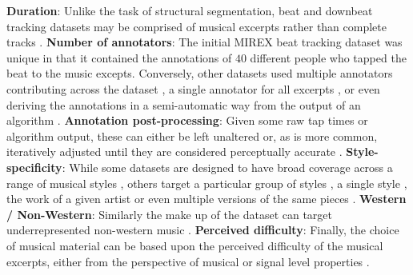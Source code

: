 \textbf{Duration}: Unlike the task of structural segmentation, beat and downbeat tracking datasets may be comprised of musical excerpts \cite{hainsworth04jasp,mckinney07jnmr,hockman12ismir, krebs13ismir} rather than complete tracks \cite{goto06ismir,Mauch2009a,digiorgi2016jaes,eremenko18ismir}. \textbf{Number of annotators}: The initial MIREX beat tracking dataset \cite{mckinney07jnmr} was unique in that it contained the annotations of $40$ different people who tapped the beat to the music excepts. Conversely, other datasets used multiple annotators contributing across the dataset \cite{holzapfel12taslp}, a single annotator for all excerpts \cite{hainsworth04jasp}, or even deriving the annotations in a semi-automatic way from the output of an algorithm \cite{Mauch2009a}. \textbf{Annotation post-processing}: Given some raw tap times or algorithm output, these can either be left unaltered \cite{mckinney07jnmr} or, as is more common, iteratively adjusted until they are considered perceptually accurate \cite{holzapfel12taslp, hainsworth04jasp, hockman12ismir}. \textbf{Style-specificity}: While some datasets are designed to have broad coverage across a range of musical styles \cite{goto06ismir,marchand15dafx,hainsworth04jasp}, others target a particular group of styles \cite{hockman12ismir,krebs13ismir}, a single style \cite{eremenko18ismir}, the work of a given artist \cite{Mauch2009a,digiorgi2016jaes} or even multiple versions of the same pieces \cite{sapp07ismir}. \textbf{Western / Non-Western}: Similarly the make up of the dataset can target underrepresented non-western music \cite{srinivasamurthy14icassp, srinivasamurthy14jnmr,nunes15ismir}. \textbf{Perceived difficulty}: Finally, the choice of musical material can be based upon the perceived difficulty of the musical excerpts, either from the perspective of musical or signal level properties \cite{holzapfel12taslp}. 
